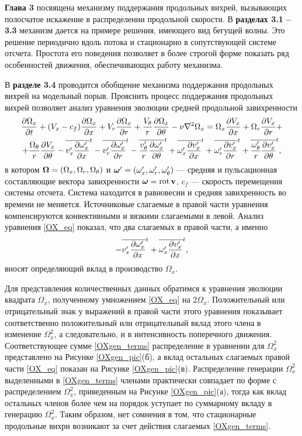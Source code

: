 \textbf{Глава 3} посвящена механизму поддержания продольных вихрей, вызывающих полосчатое искажение в распределении продольной скорости. В \textbf{разделах 3.1 -- 3.3} механизм дается на примере решения, имеющего вид бегущей волны. Это решение периодично вдоль потока и стационарно в сопутствующей системе отсчета. Простота его поведения позволяет в более строгой форме показать ряд особенностей движения, обеспечивающих работу механизма. 

В \textbf{разделе 3.4} проводится обобщение механизма поддержания продольных вихрей на модельный порыв. 
Прояснить процесс поддержания продольных вихрей позволяет анализ уравнения эволюции средней продольной завихренности
\begin{multline}\label{OX_eq}
\frac{\partial \Omega_x}{\partial t} + (V_x - c_f)\frac{\partial \Omega_x}{\partial x} + V_r \frac{\partial \Omega_x}{\partial r} + \frac{V_\theta}{r} \frac{\partial \Omega_x}{\partial \theta} - \nu\nabla^2\Omega_x= \Omega_x \frac{\partial V_x}{\partial x} + \Omega_r \frac{\partial V_x}{\partial r} + \\ + \frac{\Omega_\theta}{r} \frac{\partial V_x}{\partial \theta}
 - \overline{v'_x \frac{\partial \omega'_x}{\partial x}}^t - \overline{v'_r \frac{\partial \omega'_x}{\partial r}}^t - \overline{\frac{v'_\theta}{r} \frac{\partial \omega'_x}{\partial \theta}}^t
 + \overline{\omega'_x \frac{\partial v'_x}{\partial x}}^t + \overline{\omega'_r \frac{\partial v'_x}{\partial r}}^t + \overline{\frac{\omega'_\theta}{r} \frac{\partial v'_x}{\partial \theta}}^t,
\end{multline}
в котором $\mbox{\boldmath$\Omega$} = (\Omega_x, \Omega_r, \Omega_\theta)$ и $\mbox{\boldmath$\omega$}' = (\omega'_x, \omega'_r, \omega'_\theta)$ --- средняя и пульсационная составляющие вектора завихренности $\mbox{\boldmath$\omega$} = \mathop{}\!\operatorname{rot} \mathbf{v}$, $c_f$ --- скорость перемещения системы отсчета. Система находится в равновесии и средняя завихренность во времени не меняется. Источниковые слагаемые в правой части уравнения компенсируются конвективными и вязкими слагаемыми в левой. Анализ уравнения \eqref{OX_eq} показал, что два слагаемых в правой части, а именно
\begin{equation}\label{OXgen_terms}
- \overline{v'_x \frac{\partial \omega'_x}{\partial x}}^t + \overline{ \omega'_x \frac{\partial v'_x}{\partial x} }^t,
\end{equation}
вносят определяющий вклад в производство $\Omega_x$. 

Для представления количественных данных обратимся к уравнения эволюции квадрата $\Omega_x$, полученному умножением \eqref{OX_eq} на $2\Omega_x$. Положительный или отрицательный знак у выражений в правой части этого уравнения показывает соответственно положительный или отрицательный вклад этого члена в изменение $\Omega^2_x$, а следовательно, и в интенсивность поперечного движения. Соответствующее сумме \eqref{OXgen_terms} распределение в уравнении для $\Omega^2_x$ представлено на Рисунке \ref{OXgen_pic}(б), а вклад остальных слагаемых правой части \eqref{OX_eq} показан на Рисунке \ref{OXgen_pic}(в). Распределение генерации $\Omega^2_x$ выделенными в \eqref{OXgen_terms} членами практически совпадает по форме с распределением $\Omega^2_x$, приведенным на Рисунке \ref{OXgen_pic}(а), тогда как вклад остальных членов более чем на порядок уступает по суммарному вкладу в генерацию $\Omega^2_x$. Таким образом, нет сомнения в том, что стационарные продольные вихри возникают за счет действия слагаемых \eqref{OXgen_terms}.

